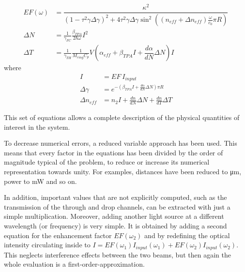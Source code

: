 \begin{align}
EF \left( \omega \right)
	&= \dfrac	{ \kappa^2 }
		{ \left( 1-\tau^2	\gamma \Delta\gamma \right)^2 + 4 \tau^2	\gamma \Delta\gamma \sin^2 \left( \left(n_{eff} + \Delta n_{eff}\right) \frac{\omega}{c_0} \pi R \right) }\\
\Delta N
	&= \frac{1}{\gamma_{FC}} \frac{\beta_{TPA}}{2\hbar \omega} I^2\\
\Delta T
	&= \frac{1}{\gamma_{TH}}\frac{1}{M_{ring}C_p} V\left(\alpha_{eff} + \beta_{TPA} I + \dfrac{d\alpha}{dN} \Delta N \right) I
\end{align}
where
\begin{align}
I 								&= EF~I_{input}\\
\Delta\gamma 		&= e^{-\left(\beta_{TPA} I + \frac{d\alpha}{dN} \Delta N \right) \pi R }\\
\Delta n_{eff} 	&= n_2 I + \frac{dn}{dN} \Delta N + \frac{dn}{dT} \Delta T
\end{align}

This set of equations allows a complete description of the physical quantities of interest in the system.

To decrease numerical errors, a reduced variable approach has been used.
This means that every factor in the equations has been divided by the order of magnitude typical of the problem, to reduce or increase its numerical representation towards unity.
For examples, distances have been reduced to \si{\um}, power to \si{\mW} and so on.

In addition, important values that are not explicitly computed, such as the transmission of the through and drop channels, can be extracted with just a simple multiplication.
Moreover, adding another light source at a different wavelength (or frequency) is very simple.
It is obtained by adding a second equation for the enhancement factor $EF(\omega_2)$ and by redefining the optical intensity circulating inside to $I = EF\left(\omega_1\right)I_{input}\left(\omega_1\right) + EF\left(\omega_2\right)I_{input}\left(\omega_2\right)$.
This neglects interference effects between the two beams, but then again the whole evaluation is a first-order-approximation.

